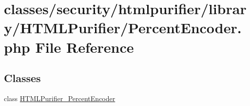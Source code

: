 \hypertarget{PercentEncoder_8php}{\section{classes/security/htmlpurifier/library/\+H\+T\+M\+L\+Purifier/\+Percent\+Encoder.php File Reference}
\label{PercentEncoder_8php}
}
\subsection*{Classes}
\begin{DoxyCompactItemize}
\item 
class \hyperlink{classHTMLPurifier__PercentEncoder}{H\+T\+M\+L\+Purifier\+\_\+\+Percent\+Encoder}
\end{DoxyCompactItemize}
